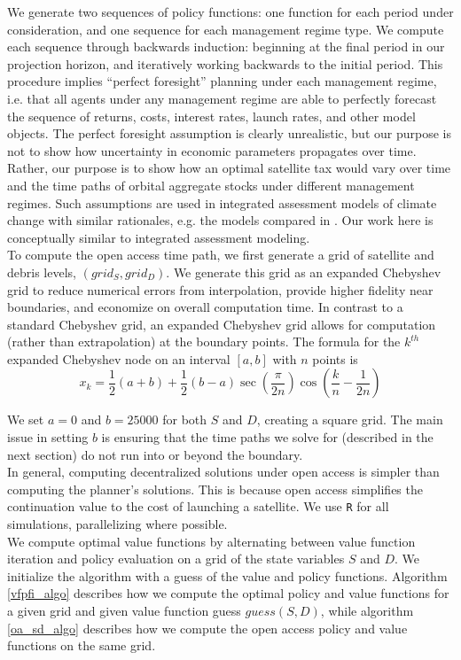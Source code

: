 \documentclass[12pt]{article}
\begin{document}
We generate two sequences of policy functions: one function for each period under consideration, and one sequence for each management regime type. We compute each sequence through backwards induction: beginning at the final period in our projection horizon, and iteratively working backwards to the initial period. This procedure implies ``perfect foresight'' planning under each management regime, i.e. that all agents under any management regime are able to perfectly forecast the sequence of returns, costs, interest rates, launch rates, and other model objects. The perfect foresight assumption is clearly unrealistic, but our purpose is not to show how uncertainty in economic parameters propagates over time. Rather, our purpose is to show how an optimal satellite tax would vary over time and the time paths of orbital aggregate stocks under different management regimes. Such assumptions are used in integrated assessment models of climate change with similar rationales, e.g. the models compared in \cite{IAMsummary}. Our work here is conceptually similar to integrated assessment modeling. \\

To compute the open access time path, we first generate a grid of satellite and debris levels, $(grid_S,grid_D)$. We generate this grid as an expanded Chebyshev grid to reduce numerical errors from interpolation, provide higher fidelity near boundaries, and economize on overall computation time. In contrast to a standard Chebyshev grid, an expanded Chebyshev grid allows for computation (rather than extrapolation) at the boundary points. The formula for the $k^{th}$ expanded Chebyshev node on an interval $[a,b]$ with $n$ points is
\[ x_k = \frac{1}{2}(a+b) + \frac{1}{2}(b-a)\sec\left( \frac{\pi}{2n} \right) \cos\left( \frac{k}{n} - \frac{1}{2n} \right) \]

We set $a=0$ and $b=25000$ for both $S$ and $D$, creating a square grid. The main issue in setting $b$ is ensuring that the time paths we solve for (described in the next section) do not run into or beyond the boundary. \\

In general, computing decentralized solutions under open access is simpler than computing the planner's solutions. This is because open access simplifies the continuation value to the cost of launching a satellite. We use \texttt{R} for all simulations, parallelizing where possible. \\

We compute optimal value functions by alternating between value function iteration and policy evaluation on a grid of the state variables $S$ and $D$. We initialize the algorithm with a guess of the value and policy functions. Algorithm \ref{vfpfi_algo} describes how we compute the optimal policy and value functions for a given grid and given value function guess $guess(S,D)$, while algorithm \ref{oa_sd_algo} describes how we compute the open access policy and value functions on the same grid. \\
\end{document}
